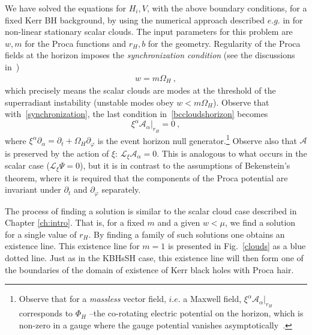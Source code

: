 We have solved the equations for $H_i,V$, with the above boundary  conditions, for
a fixed Kerr BH background, by using the numerical approach described $e.g.$ in \cite{Herdeiro:2014pka}
for non-linear stationary scalar clouds.
The input parameters for this problem are $w,m$ for the Proca functions and $r_H,b$ for the geometry.
Regularity of the Proca fields at the horizon imposes the \textit{synchronization condition} (see the discussions in~\cite{Benone:2014ssa,Brihaye:2014nba})
 \begin{eqnarray}
w=m\Omega_H~,
\label{synchronization} 
\end{eqnarray}
which precisely means the scalar clouds are modes at the threshold of the superradiant instability (unstable modes obey $w<m\Omega_H$).  Observe that with~\eqref{synchronization}, the last condition in~\eqref{bccloudshorizon} becomes
\begin{equation}
\label{condA}
\xi^\alpha \mathcal{A}_\alpha\big|_{r_H}=0 \ ,
\end{equation}
%
where $\xi^\alpha\partial_\alpha=\partial_t+\Omega_H\partial_\varphi$ is the event horizon null generator.\footnote{Observe that for a \textit{massless} vector field, $i.e.$ a Maxwell field, $\xi^\alpha \mathcal{A}_\alpha\big|_{r_H}$ corresponds 
to $\Phi_H$ --the co-rotating electric potential on the horizon, which is non-zero in a gauge where the gauge potential vanishes asymptotically~\cite{Townsend:1997ku}.}
Observe also that  $\mathcal{A}$ is preserved by the action of $\xi$: $\mathcal{L}_\xi\mathcal{A}_\alpha=0$. 
This is analogous to what occurs in the scalar case ($\mathcal{L}_\xi\Psi=0$), but it is in contrast to the assumptions of Bekenstein's theorem, where it is required that the components of the Proca potential are invariant under $\partial_t$ and $\partial_\varphi$ separately.

The process of finding a solution is similar to the scalar cloud case described in Chapter \ref{ch:intro}.
That is, for a fixed $m$ and a given $w<\mu$, we find a solution for a single value of $r_H$.
By finding a family of such solutions one obtains an existence line.
This existence line for $m=1$ is presented in Fig.~\ref{clouds} as a blue dotted line.
Just as in the KBHsSH case, this existence line will then form one of the boundaries of the domain of existence of Kerr black holes with Proca hair.

